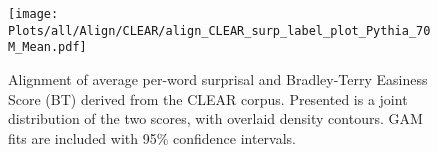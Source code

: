 \begin{figure}[ht]
    \centering
    \texttt{[image: Plots/all/Align/CLEAR/align\_CLEAR\_surp\_label\_plot\_Pythia\_70M\_Mean.pdf]}
    \caption{Alignment of average per-word surprisal and Bradley-Terry Easiness Score (BT) derived from the CLEAR corpus.  
    Presented is a joint distribution of the two scores, with overlaid density contours.  
    GAM fits are included with 95\% confidence intervals.}

    \label{fig:align_CLEAR_surp_label_plot_Pythia_70M_Mean}
\end{figure}
